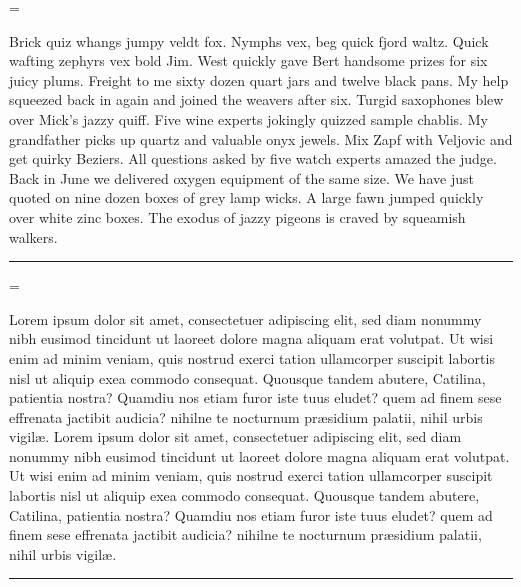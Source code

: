 \pantext={Brick quiz whangs jumpy veldt fox.
Nymphs vex, beg quick fjord waltz.
Quick wafting zephyrs vex bold Jim.
West quickly gave Bert handsome prizes for six juicy plums.
Freight to me sixty dozen quart jars and twelve black pans.
My help squeezed back in again and joined the weavers after six.
Turgid saxophones blew over Mick's jazzy quiff.
Five wine experts jokingly quizzed sample chablis.
My grandfather picks up quartz and valuable onyx jewels.
Mix Zapf with Veljovic and get quirky Beziers.
All questions asked by five watch experts amazed the judge.
Back in June we delivered oxygen equipment of the same size.
We have just quoted on nine dozen boxes of grey lamp wicks.
A large fawn jumped quickly over white zinc boxes.
The exodus of jazzy pigeons is craved by squeamish walkers.\thinspace\nobreak\leaders\hrule\hfill\hbox{}\par}

\loremtext={Lorem ipsum
dolor sit amet, consectetuer adipiscing elit, sed diam
nonummy nibh eusi\-mod tincidunt ut laor\-eet dolore magna
ali\-quam erat volutpat. Ut wisi enim ad minim veniam, quis
nostrud exerci tation ullamcorper suscipit la\-bortis nisl
ut ali\-quip exea commodo consequat.
Quousque tandem abutere, Catilina, patientia nostra? Quamdiu nos etiam furor iste tuus eludet?
quem ad finem sese effrenata jactibit audicia? nihilne te nocturnum pr\ae sidium palatii, nihil
urbis vigil\ae .
Lorem ipsum
dolor sit amet, consectetuer adipiscing elit, sed diam
nonummy nibh eusi\-mod tincidunt ut laor\-eet dolore magna
ali\-quam erat volutpat. Ut wisi enim ad minim veniam, quis
nostrud exerci tation ullamcorper suscipit la\-bortis nisl
ut ali\-quip exea commodo consequat.
Quousque tandem abutere, Catilina, patientia nostra? Quamdiu nos etiam furor iste tuus eludet?
quem ad finem sese effrenata jactibit audicia? nihilne te nocturnum pr\ae sidium palatii, nihil
urbis vigil\ae .\thinspace\nobreak\leaders\hrule\hfill\null\par}

\def\abc{abcdefghijklmnopqrstuvwxyz}
\def\habc{\abc\abc abcdefghijklm}
\def\dabc{AGQMstaefgpy1234?!\&}
\def\ucabc{ABCDEFGHIJKLMNOPQRSTUVWXYZ\&}
\def\freqabc{\text  zjqx%
       kkvv%
       bbbbppppyyyywwwwgggg%
       mmmmmmffffffccccccuuuuuu%
       lllllllldddddddd%
       hhhhhhhhhhhhrrrrrrrrrrrrssssssssssss%
       ooooooooooooooiiiiiiiiiiiiiinnnnnnnnnnnnnn%
       aaaaaaaaaaaaaaaatttttttttttttttttt%
       eeeeeeeeeeeeeeeeeeeeeeee}%

